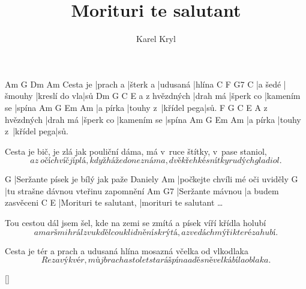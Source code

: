 \documentclass{song}
\title{Morituri te salutant}
\author{Karel Kryl}
\begin{document}
\strophe
         Am       G        Dm       Am
Cesta je |prach a |šterk a |udusaná |hlína
C       F       G7            C
|a šedé |šmouhy |kreslí do vla|sů
              Dm       G         C           E
a z hvězdných |drah má |šperk co |kamením se |spína
Am       G        Em          Am
|a pírka |touhy z~|křídel pega|sů.
              F        G         C           E
A z hvězdných |drah má |šperk co |kamením se |spína
Am       G        Em          Am
|a pírka |touhy z~|křídel pega|sů.
\endstrophe

\strophe*
Cesta je bič, je zlá jak pouliční dáma,
má v~ruce štítky, v~pase staniol,
\[ a z~očí chvíč jí plá, když háže do neznáma,
dvě křehké snítky rudých gladiol. \]
\endstrophe

G
|Seržante písek je bílý jak paže Daniely
Am
|počkejte chvíli mé oči uviděly
G
|tu strašne dávnou vteřinu zapomnění
Am               G7
|Seržante mávnou |a budem zasvěceni
C                      E
|Morituri te salutant, |morituri te salutant \ldots
\endstrophe

\strophe*
Tou cestou dál jsem šel, kde na zemi se zmítá
a písek víří křídla holubí
\[ a marš mi hrál zvuk děl co uklidnění skrýtá,
a zvedá chmýři které zahubí. \]
\endstrophe

\strophe*
Cesta je tér a prach a udusaná hlína
mosazná včelka od vlkodlaka
\[ Rezavý kvér, můj brach a sto let stará špína
a děsně velká bíla oblaka. \]
\endstrophe

\ref{}
\end{document}
